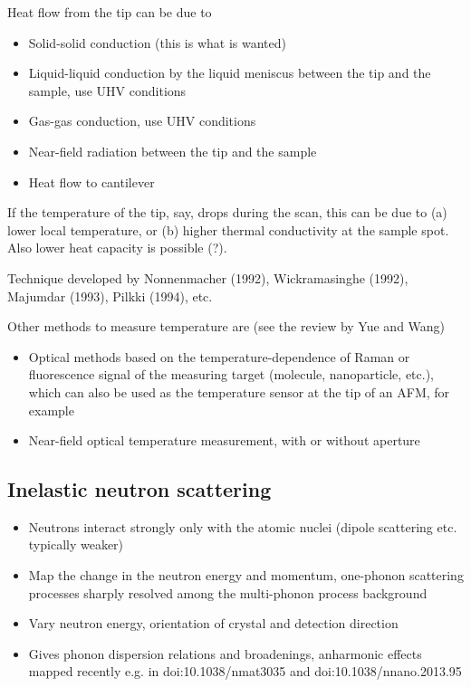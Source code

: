 Heat flow from the tip can be due to
\begin{itemize}
 \item Solid-solid conduction (this is what is wanted)
 \item Liquid-liquid conduction by the liquid meniscus between the tip and the sample, use UHV conditions
 \item Gas-gas conduction, use UHV conditions
 \item Near-field radiation between the tip and the sample
 \item Heat flow to cantilever
\end{itemize}

If the temperature of the tip, say, drops during the scan, this can be due to (a) lower local temperature, or (b) higher thermal conductivity at the sample spot. Also lower heat capacity is possible (?). 

Technique developed by Nonnenmacher (1992), Wickramasinghe (1992), Majumdar (1993), Pilkki (1994), etc.

Other methods to measure temperature are (see the review by Yue and Wang)
\begin{itemize}
 \item Optical methods based on the temperature-dependence of Raman or fluorescence signal of the measuring target (molecule, nanoparticle, etc.), which can also be used as the temperature sensor at the tip of an AFM, for example
 \item Near-field optical temperature measurement, with or without aperture
\end{itemize}

\subsection{Inelastic neutron scattering}
 \begin{itemize}
  \item Neutrons interact strongly only with the atomic nuclei (dipole scattering etc. typically weaker)
  \item Map the change in the neutron energy and momentum, one-phonon scattering processes sharply resolved among the multi-phonon process background
  \item Vary neutron energy, orientation of crystal and detection direction
  \item Gives phonon dispersion relations and broadenings, anharmonic effects mapped recently e.g. in doi:10.1038/nmat3035 and doi:10.1038/nnano.2013.95
 \end{itemize}
\fi
